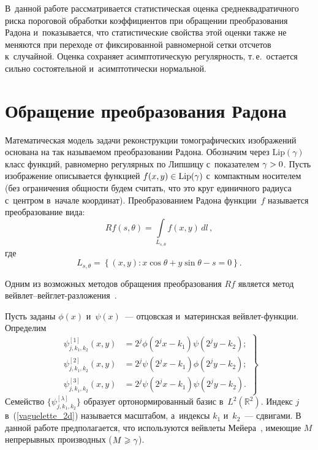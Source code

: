 \begin{multicols}{2}
В~данной работе рас\-смат\-ри\-ва\-ет\-ся статистическая 
оценка среднеквадратичного риска пороговой обработки коэффициентов при 
обращении преобразования Радона и~показывается, что статистические 
свойства этой оценки так\-же не меняются при переходе от фиксированной 
равномерной сетки отсчетов к~случайной. Оценка сохраняет асимптотическую 
регулярность, т.\,е.\ остается сильно состоятельной и~асимптотически 
нормальной.



\section{Обращение преобразования Радона}

Математическая модель задачи реконструкции томографических изображений 
основана на так называемом преобразовании Радона. Обозначим через 
$\mathrm{Lip}(\gamma)$ класс функций, равномерно регулярных по Липшицу 
с~показателем $\gamma\hm>0$. Пусть изоб\-ра\-же\-ние описывается функцией 
$f(x,y)\hm\in\mathrm{Lip}(\gamma)$ с~компактным носителем (без 
ограничения общ\-ности будем считать, что это круг единичного радиуса 
с~центром в~начале координат). Преобразованием Радона функции~$f$ 
называется преобразование вида:
%
\begin{equation*}
Rf(s,\theta) = \int\limits_{L_{s,\theta}} f(x,y)\, dl\,,
\end{equation*}
где
\begin{equation*}
L_{s,\theta} = \left\{(x,y)\colon x\cos\theta + y\sin\theta - s = 0 
\right\}.
\end{equation*}

Одним из возможных методов обращения преобразования $Rf$ является метод 
вейвлет--вейг\-лет-раз\-ло\-же\-ния~\cite{D94}.

Пусть заданы $\phi(x)$ и~$\psi(x)$~--- отцовская и~материнская вейв\-лет-функции.
Определим
%
\begin{equation}
\left.
\begin{array}{rl}
\psi_{j,k_1,k_2}^{[1]} (x,y) &= 2^j \phi(2^j x - k_1) \psi(2^j y - 
k_2);\\[6pt]
\psi_{j,k_1,k_2}^{[2]} (x,y) &= 2^j \psi(2^j x - k_1) \phi(2^j y - 
k_2);\\[6pt]
\psi_{j,k_1,k_2}^{[3]} (x,y) &= 2^j \psi(2^j x - k_1) \psi(2^j y - k_2).
\end{array}
\right\}
\label{vaguelette_2d}
\end{equation}
Семейство $\{\psi^{[\lambda]}_{j,k_1,k_2}\}$
образует ортонормированный базис в~$L^2(\mathbb{R}^2)$. Индекс $j$ 
в~(\ref{vaguelette_2d}) называется масштабом, а~индексы $k_1$ и~$k_2$~---
сдвигами. В данной работе предполагается, что используются вейвлеты 
Мейера~\cite{Mall99}, имеющие $M$ непрерывных производных 
($M\hm\geqslant\gamma$).


\end{multicols}

